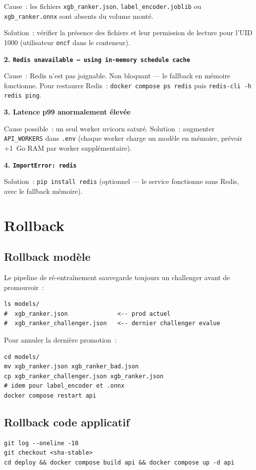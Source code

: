 \documentclass[12pt, a4paper]{report}
\begin{document}
Cause~: les fichiers \texttt{xgb\_ranker.json}, \texttt{label\_encoder.joblib}
ou \texttt{xgb\_ranker.onnx} sont absents du volume monté.

Solution~: vérifier la présence des fichiers et leur permission de lecture
pour l'UID 1000 (utilisateur \texttt{oncf} dans le conteneur).

\medskip
\textbf{2. \texttt{Redis unavailable --- using in-memory schedule cache}}

Cause~: Redis n'est pas joignable. Non bloquant --- le fallback en mémoire
fonctionne. Pour restaurer Redis~: \texttt{docker compose ps redis} puis
\texttt{redis-cli -h redis ping}.

\medskip
\textbf{3. Latence p99 anormalement élevée}

Cause possible~: un seul worker uvicorn saturé. Solution~: augmenter
\texttt{API\_WORKERS} dans \texttt{.env} (chaque worker charge un modèle
en mémoire, prévoir +1~Go RAM par worker supplémentaire).

\medskip
\textbf{4. \texttt{ImportError: redis}}

Solution~: \texttt{pip install redis} (optionnel --- le service fonctionne
sans Redis, avec le fallback mémoire).

\section{Rollback}

\subsection{Rollback modèle}

Le pipeline de ré-entraînement sauvegarde toujours un challenger avant de
promouvoir~:

\begin{lstlisting}[style=bash]
ls models/
#  xgb_ranker.json              <-- prod actuel
#  xgb_ranker_challenger.json   <-- dernier challenger evalue
\end{lstlisting}

Pour annuler la dernière promotion~:
\begin{lstlisting}[style=bash]
cd models/
mv xgb_ranker.json xgb_ranker_bad.json
cp xgb_ranker_challenger.json xgb_ranker.json
# idem pour label_encoder et .onnx
docker compose restart api
\end{lstlisting}

\subsection{Rollback code applicatif}

\begin{lstlisting}[style=bash]
git log --oneline -10
git checkout <sha-stable>
cd deploy && docker compose build api && docker compose up -d api
\end{lstlisting}
\end{document}
